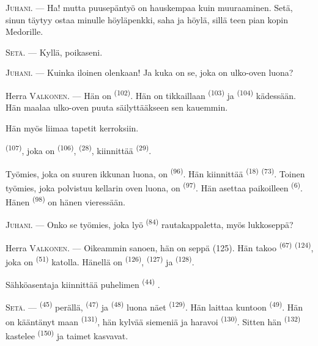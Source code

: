 \textsc{Juhani}. --- Ha! mutta puusepäntyö on hauskempaa kuin muuraaminen. Setä,
sinun täytyy ostaa minulle höyläpenkki, saha ja höylä, sillä teen pian kopin
Medorille.

\textsc{Setä}. --- Kyllä, poikaseni.

\textsc{Juhani}. --- Kuinka iloinen olenkaan! Ja kuka on se, joka on ulko-oven
luona?

\VUsaut{3.0mm}
\VUsaut{3.0mm}

Herra \textsc{Valkonen}. --- Hän on  \textsuperscript{(102)}.
Hän on tikkaillaan  \textsuperscript{(103)} ja
 \textsuperscript{(104)} kädessään. Hän maalaa ulko-oven puuta
säilyttääkseen sen kauemmin.

Hän myös liimaa tapetit kerroksiin.

 \textsuperscript{(107)}, joka on 
\textsuperscript{(106)},  \textsuperscript{(28)},
kiinnittää  \textsuperscript{(29)}.

Työmies, joka on suuren ikkunan luona, on 
\textsuperscript{(96)}. Hän kiinnittää 
\textsuperscript{(18)}  \textsuperscript{(73)}. Toinen työmies,
joka polvistuu kellarin oven luona, on 
\textsuperscript{(97)}. Hän asettaa paikoilleen 
\textsuperscript{(6)}. Hänen  \textsuperscript{(98)} on hänen
vieressään.

\textsc{Juhani}. --- Onko se työmies, joka lyö 
\textsuperscript{(84)} rautakappaletta, myös lukkoseppä?

Herra \textsc{Valkonen}. --- Oikeammin sanoen, hän on seppä (125). Hän takoo
 \textsuperscript{(67)} 
\textsuperscript{(124)}, joka on  \textsuperscript{(51)}
katolla. Hänellä on  \textsuperscript{(126)}, 
\textsuperscript{(127)} ja  \textsuperscript{(128)}.

Sähköasentaja kiinnittää puhelimen  \textsuperscript{(44)}
.

\VUsaut{3.0mm}

\textsc{Setä}. ---  \textsuperscript{(45)} perällä,
 \textsuperscript{(47)} ja 
\textsuperscript{(48)} luona näet  \textsuperscript{(129)}.
Hän laittaa kuntoon  \textsuperscript{(49)}. Hän on
kääntänyt maan  \textsuperscript{(131)}, hän kylvää siemeniä
ja haravoi  \textsuperscript{(130)}. Sitten hän
 \textsuperscript{(132)} kastelee
 \textsuperscript{(150)} ja taimet kasvavat.

